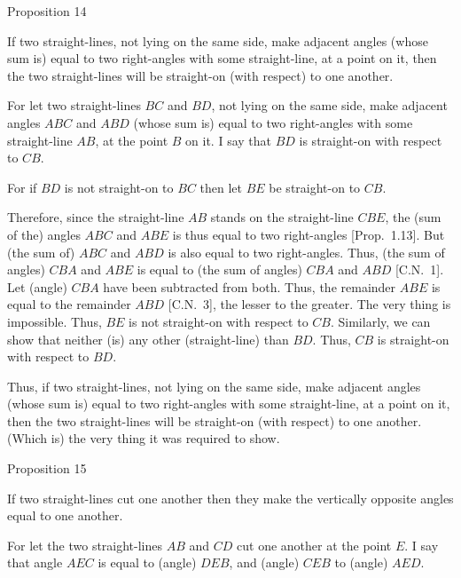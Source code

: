 \begin{center}
{\large Proposition 14}
\end{center}

If two straight-lines, not lying on the same side,  make adjacent angles (whose sum is) equal to two right-angles  with some straight-line, at a point on it, then the two straight-lines
will be straight-on (with respect) to one another.

\epsfysize=1.8in
\centerline{}

For let two
straight-lines $BC$ and $BD$, not lying on the same side,  make adjacent angles $ABC$ and $ABD$ (whose sum is)
equal to two right-angles with some straight-line $AB$, at the point $B$ on it. I say
that $BD$ is  straight-on with respect to $CB$.

For if $BD$ is not straight-on to $BC$ then let $BE$ be straight-on to $CB$.

Therefore, since the straight-line $AB$ stands on the straight-line $CBE$, the (sum of the) angles $ABC$ and $ABE$ is thus equal to two right-angles [Prop.~1.13]. But (the sum of) $ABC$ and $ABD$ is also equal to two right-angles.
Thus, 
(the sum of angles) $CBA$ and $ABE$ is equal to (the sum of angles) $CBA$ and $ABD$ [C.N.~1]. Let (angle)
$CBA$ have been subtracted from both. Thus, the remainder $ABE$ is
equal to the remainder $ABD$ [C.N.~3], the lesser to the greater. The very thing is impossible. Thus, $BE$ is not straight-on with respect to $CB$. Similarly, we can
show that neither (is) any other (straight-line)   than $BD$.
Thus, $CB$ is straight-on with respect to $BD$.

Thus, if two straight-lines, not lying on the same side,  make adjacent angles (whose sum is) equal to two right-angles with some straight-line, at a point on it, then the two straight-lines
will be straight-on (with respect) to one another. (Which is) the very thing it
was required to show.


\begin{center}
{\large Proposition 15}
\end{center}

If two straight-lines cut one another then they make the vertically opposite angles
equal to one another.

For let the two straight-lines $AB$ and $CD$ cut one another at the point $E$. I say
that  angle $AEC$ is equal to (angle) $DEB$, and (angle) $CEB$ to (angle) $AED$.

